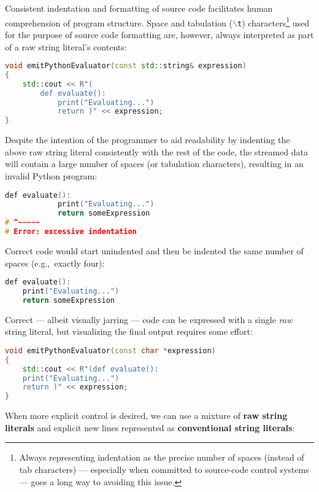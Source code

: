 Consistent indentation and formatting of source code facilitates human
comprehension of program structure. Space and tabulation
(\texttt{$\backslash$t}) characters{\cprotect\footnote{Always
representing indentation as the precise number of spaces (instead of
tab characters) --- especially when committed to source-code control
  systems --- goes a long way to avoiding this issue.}} used for the
purpose of source code formatting are, however, always interpreted as
part of a raw string literal's contents:

\begin{lstlisting}[language=C++]
void emitPythonEvaluator(const std::string& expression)
{
    std::cout << R"(
        def evaluate():
            print("Evaluating...")
            return )" << expression;
}
\end{lstlisting}

\noindent Despite the intention of the programmer to aid readability by indenting
the above raw string literal consistently with the rest of the code, the
streamed data will contain a large number of spaces (or tabulation
characters), resulting in an invalid Python program:

\begin{lstlisting}[language=C++]
        def evaluate():
            print("Evaluating...")
            return someExpression
# ^~~~~~
# Error: excessive indentation
\end{lstlisting}

\noindent Correct code would start unindented and then be indented the same number
of spaces (e.g.,~exactly four):

\begin{lstlisting}[language=C++]
def evaluate():
    print("Evaluating...")
    return someExpression
\end{lstlisting}

\noindent Correct --- albeit visually jarring --- code can be expressed with a
single \emph{raw} string literal, but visualizing the final output requires some effort:

\begin{lstlisting}[language=C++]
void emitPythonEvaluator(const char *expression)
{
    std::cout << R"(def evaluate():
    print("Evaluating...")
    return )" << expression;
}
\end{lstlisting}

\noindent When more explicit control is desired, we can use a mixture of
\textbf{raw string literals} and explicit new lines represented as
\textbf{conventional string literals}:

